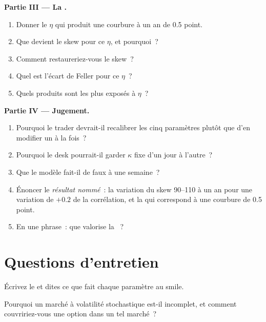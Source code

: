 \begin{problem}
\medskip\noindent\textbf{Partie III --- La .}
\begin{enumerate}[resume]
\item Donner le $\eta$ qui produit une courbure à un an de 0.5 point.
\item Que devient le skew pour ce $\eta$, et pourquoi~?
\item Comment restaureriez-vous le skew~?
\item Quel est l'écart de Feller pour ce $\eta$~?
\item Quels produits sont les plus exposés à $\eta$~?
\end{enumerate}

\medskip\noindent\textbf{Partie IV --- Jugement.}
\begin{enumerate}[resume]
\item Pourquoi le trader devrait-il recalibrer les cinq paramètres plutôt que d'en modifier un à la fois~?
\item Pourquoi le desk pourrait-il garder $\kappa$ fixe d'un jour à l'autre~?
\item Que le modèle fait-il de faux à une semaine~?
\item Énoncer le \emph{résultat nommé}~: la variation du skew 90--110 à un an pour une variation de $+0.2$ de la corrélation,
et la  qui correspond à une courbure de 0.5 point.
\item En une phrase~: que valorise la ~?
\end{enumerate}
\end{problem}

\section{Questions d'entretien}

\begin{interviewq}\label{iq:dv:stochastic-volatility:1}
Écrivez le  et dites ce que fait chaque paramètre au smile.
\end{interviewq}

\begin{interviewq}\label{iq:dv:stochastic-volatility:2}
Pourquoi un marché à volatilité stochastique est-il incomplet, et comment couvririez-vous une option dans un tel marché~?
\end{interviewq}

